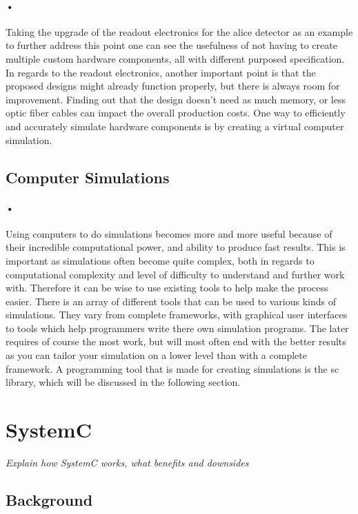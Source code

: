 \documentclass[a4paper, 12pt]{report}\dfrac{\right }{•}
\begin{document}
\paragraph{•}
Taking the upgrade of the readout electronics for the \gls{alice} detector as an example to further address this point one can see the usefulness of not having to create multiple custom hardware components, all with different purposed specification.
In regards to the readout electronics, another important point is that the proposed designs might already function properly, but there is always room for improvement.
Finding out that the design doesn't need as much memory, or less optic fiber cables can impact the overall production costs.
One way to efficiently and accurately simulate hardware components is by creating a virtual computer simulation.

\subsection{Computer Simulations}
\paragraph{•}
Using computers to do simulations becomes more and more useful because of their incredible computational power, and ability to produce fast results.
This is important as simulations often become quite complex, both in regards to computational complexity and level of difficulty to understand and further work with.
Therefore it can be wise to use existing tools to help make the process easier.
There is an array of different tools that can be used to various kinds of simulations.
They vary from complete frameworks, with graphical user interfaces to tools which help programmers write there own simulation programs.
The later requires of course the most work, but will most often end with the better results as you can tailor your simulation on a lower level than with a complete framework.
A programming tool that is made for creating simulations is the \gls{sc} library, which will be discussed in the following section.

\section{SystemC}
\textit{Explain how SystemC works, what benefits and downsides}

\subsection{Background}
\end{document}
